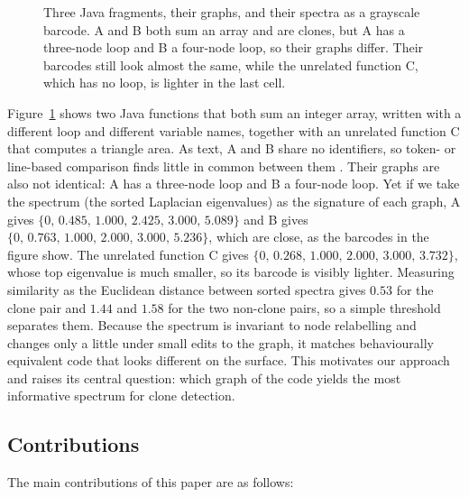 \documentclass[authoryear,final,5p,times,twocolumn]{elsarticle}
\theoremstyle{plain}
\begin{document}
\begin{figure}[t]
\caption{Three Java fragments, their graphs, and their spectra as a
grayscale barcode. A and B both sum an array and are clones, but A has a
three-node loop and B a four-node loop, so their graphs differ. Their
barcodes still look almost the same, while the unrelated function C, which
has no loop, is lighter in the last cell.}
\label{fig:motivating_exp}
\end{figure}

Figure~\ref{fig:motivating_exp} shows two Java functions that both sum an
integer array, written with a different loop and different variable names,
together with an unrelated function C that computes a triangle area. As
text, A and B share no identifiers, so token- or line-based comparison
finds little in common between them
\cite{roy2007survey,alomari2020semanticclonebench}. Their graphs are also
not identical: A has a three-node loop and B a four-node loop. Yet if we
take the spectrum (the sorted Laplacian eigenvalues) as the signature of
each graph, A gives $\{0,\,0.485,\,1.000,\,2.425,\,3.000,\,5.089\}$ and B
gives $\{0,\,0.763,\,1.000,\,2.000,\,3.000,\,5.236\}$, which are close, as
the barcodes in the figure show. The unrelated function C gives
$\{0,\,0.268,\,1.000,\,2.000,\,3.000,\,3.732\}$, whose top eigenvalue is
much smaller, so its barcode is visibly lighter. Measuring similarity as the
Euclidean distance between sorted spectra gives $0.53$ for the clone pair
and $1.44$ and $1.58$ for the two non-clone pairs, so a simple threshold
separates them. Because the spectrum is invariant to node relabelling and
changes only a little under small edits to the graph, it matches
behaviourally equivalent code that looks different on the surface. This
motivates our approach and raises its central question: which graph of the
code yields the most informative spectrum for clone detection.

\subsection{Contributions}
\label{subsec:contributions}

The main contributions of this paper are as follows:
\end{document}

